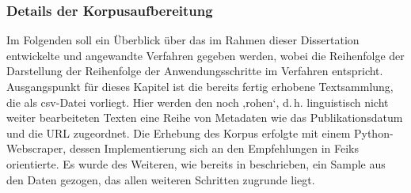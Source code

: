 \subsubsection{Details der Korpusaufbereitung}\label{details-der-korpusaufbereitung}

Im Folgenden soll ein Überblick über das im Rahmen dieser Dissertation entwickelte und angewandte Verfahren gegeben werden, wobei die Reihenfolge der Darstellung der Reihenfolge der Anwendungsschritte im Verfahren entspricht. Ausgangspunkt für dieses Kapitel ist die bereits fertig erhobene Textsammlung, die als csv-Datei vorliegt. Hier werden den noch ‚rohen`, d.\,h. linguistisch nicht weiter bearbeiteten Texten eine Reihe von Metadaten wie das Publikationsdatum und die URL zugeordnet. Die Erhebung des Korpus erfolgte mit einem Python-Webscraper, dessen Implementierung sich an den Empfehlungen in Feiks \autocite*{feiksEmpirischeSozialforschungMit2019} orientierte. Es wurde des Weiteren, wie bereits in  beschrieben, ein Sample aus den Daten gezogen, das allen weiteren Schritten zugrunde liegt.

